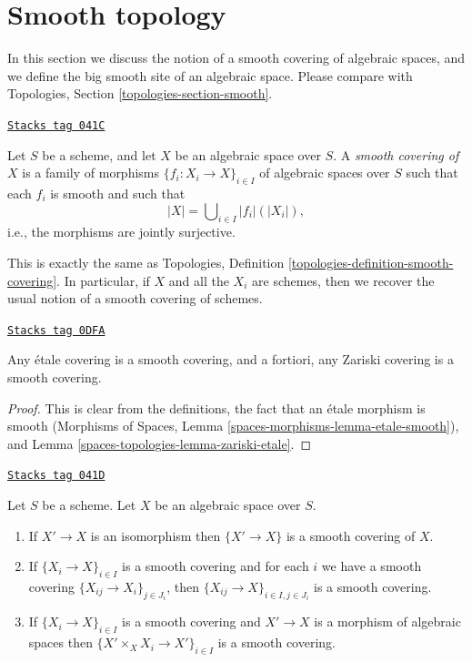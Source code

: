 \section{Smooth topology}
\label{spaces-topologies-section-smooth}
In this section we discuss the notion of a smooth covering of
algebraic spaces, and we define the big smooth site of an
algebraic space. Please compare with
Topologies, Section \ref{topologies-section-smooth}.

\begin{definition}
\label{spaces-topologies-definition-smooth-covering}
\href{https://stacks.math.columbia.edu/tag/041C}{\texttt{Stacks tag 041C}}

Let $S$ be a scheme, and let $X$ be an algebraic space over $S$.
A {\it smooth covering of $X$} is a family of morphisms
$\{f_i : X_i \to X\}_{i \in I}$ of algebraic spaces over $S$
such that each $f_i$ is smooth
and such that
$$
|X| = \bigcup\nolimits_{i \in I} |f_i|(|X_i|),
$$
i.e., the morphisms are jointly surjective.
\end{definition}

This is exactly the same as
Topologies, Definition \ref{topologies-definition-smooth-covering}.
In particular, if $X$ and all the $X_i$ are schemes, then we recover the
usual notion of a smooth covering of schemes.

\begin{lemma}
\label{spaces-topologies-lemma-zariski-etale-smooth}
\href{https://stacks.math.columbia.edu/tag/0DFA}{\texttt{Stacks tag 0DFA}}

Any \'etale covering is a smooth covering, and a fortiori,
any Zariski covering is a smooth covering.
\end{lemma}

\begin{proof}
This is clear from the definitions, the fact that an
\'etale morphism is smooth
(Morphisms of Spaces, Lemma \ref{spaces-morphisms-lemma-etale-smooth}), and
Lemma \ref{spaces-topologies-lemma-zariski-etale}.
\end{proof}

\begin{lemma}[Smooth]
\label{spaces-topologies-lemma-smooth}
\href{https://stacks.math.columbia.edu/tag/041D}{\texttt{Stacks tag 041D}}

Let $S$ be a scheme.
Let $X$ be an algebraic space over $S$.
\begin{enumerate}
\item If $X' \to X$ is an isomorphism then $\{X' \to X\}$
is a smooth covering of $X$.
\item If $\{X_i \to X\}_{i\in I}$ is a smooth covering and for each
$i$ we have a smooth covering $\{X_{ij} \to X_i\}_{j\in J_i}$, then
$\{X_{ij} \to X\}_{i \in I, j\in J_i}$ is a smooth covering.
\item If $\{X_i \to X\}_{i\in I}$ is a smooth covering
and $X' \to X$ is a morphism of algebraic spaces then
$\{X' \times_X X_i \to X'\}_{i\in I}$ is a smooth covering.
\end{enumerate}
\end{lemma}

